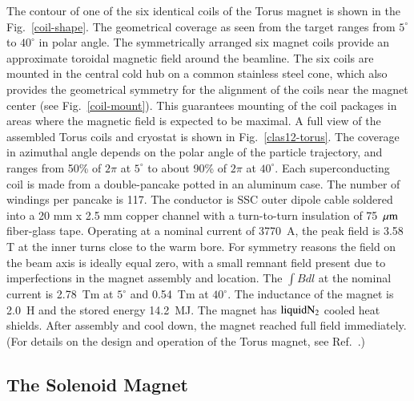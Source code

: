 \documentclass[final,3p,twocolumn]{elsarticle}
\begin{document}
The contour of one of the six identical coils of the Torus magnet is shown in the  Fig.~\ref{coil-shape}. The 
geometrical coverage as seen from the target ranges from
 $5^\circ$ to $40^\circ$ in polar angle. The symmetrically arranged six magnet coils provide an approximate toroidal magnetic field around the beamline. The six coils are mounted in the central cold hub on a common
stainless steel cone, which also provides the geometrical symmetry for the alignment of the coils near the magnet center (see Fig.~\ref{coil-mount}). 
This guarantees mounting of the coil packages in areas where the magnetic field is expected to be maximal. A full 
view of the assembled Torus coils and cryostat is shown in Fig.~\ref{clas12-torus}. The coverage in azimuthal angle depends on the polar angle of the particle 
 trajectory, and ranges from 50\% of $2\pi$ at $5^\circ$ to about 90\% of $2\pi$ at $40^\circ$. Each superconducting coil 
 is made from a double-pancake potted in an aluminum case. The number of windings per pancake is 117.
The conductor is SSC outer dipole cable soldered into a 20 mm x 2.5 mm copper channel with a turn-to-turn insulation 
of 75~$\mu \rm{m}$ fiber-glass tape. 
Operating at a nominal current of 3770~A, the peak field is 3.58 T at the inner turns close to the warm bore. 
For symmetry reasons the field on the beam axis is ideally equal zero, with a small remnant field present due to 
imperfections in the magnet assembly and location. The $\int {Bdl}$ at the nominal current is 2.78~Tm at $5^\circ$ and 0.54~Tm at $40^\circ$. The inductance of the magnet is 2.0~H and the stored energy 14.2~MJ. The magnet has $\rm liquid N_2$ cooled heat shields. After assembly and cool down, the magnet reached full field immediately.  (For details on the design and operation of the Torus magnet, see Ref.~\cite{clas12-magnets}.)

\subsection{The Solenoid Magnet}
\end{document}
